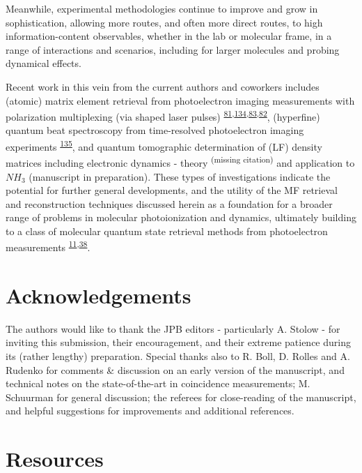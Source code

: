 \documentclass[10pt]{article}
\begin{document}
Meanwhile, experimental methodologies continue to improve and grow in sophistication, allowing more routes, and often more direct routes, to high information-content observables, whether in the lab or molecular frame, in a range of interactions and scenarios, including for larger molecules and probing dynamical effects. 


Recent work in this vein from the current authors and coworkers includes (atomic) matrix element retrieval from photoelectron imaging measurements with polarization multiplexing (via shaped laser pulses) \textsuperscript{\hyperref[csl:81]{81},\hyperref[csl:134]{134},\hyperref[csl:83]{83},\hyperref[csl:82]{82}}, (hyperfine) quantum beat spectroscopy from time-resolved photoelectron imaging experiments \textsuperscript{\hyperref[csl:135]{135}}, and quantum tomographic determination of (LF) density matrices including electronic dynamics - theory \textsuperscript{(missing citation)} and application to $NH_3$ (manuscript in preparation). These types of investigations indicate the potential for further general developments, and the utility of the MF retrieval and reconstruction techniques discussed herein as a foundation for a broader range of problems in molecular photoionization and dynamics, ultimately building to a class of molecular quantum state retrieval methods from photoelectron measurements \textsuperscript{\hyperref[csl:11]{11},\hyperref[csl:38]{38}}. 






\section{Acknowledgements}

The authors would like to thank the JPB editors - particularly A. Stolow - for inviting this submission, their encouragement, and their extreme patience during its (rather lengthy) preparation. Special thanks also to R. Boll, D. Rolles and A. Rudenko for comments \& discussion on an early version of the manuscript, and technical notes on the state-of-the-art in coincidence measurements; M. Schuurman for general discussion; the referees for close-reading of the manuscript, and helpful suggestions for improvements and additional references.

\section{Resources\label{sec:resources}}
\end{document}
